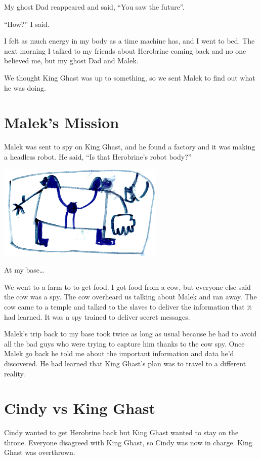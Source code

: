 \documentclass[oneside]{book}
\begin{document}
My ghost Dad reappeared and said, ``You saw the future''.

``How?'' I said.

I felt as much energy in my body as a time machine has, and I went to
bed. The next morning I talked to my friends about Herobrine coming back
and no one believed me, but my ghost Dad and Malek.

We thought King Ghast was up to something, so we sent Malek to find out
what he was doing.

\chapter{Malek's Mission}\label{maleks-mission}

Malek was sent to spy on King Ghast, and he found a factory and it was
making a headless robot. He said, ``Is that Herobrine's robot body?''

\includegraphics[width=3.12500in]{img/10-herobrine.jpg}

At my base\ldots{}

We went to a farm to to get food. I got food from a cow, but everyone
else said the cow was a spy. The cow overheard us talking about Malek
and ran away. The cow came to a temple and talked to the slaves to
deliver the information that it had learned. It was a spy trained to
deliver secret messages.

Malek's trip back to my base took twice as long as usual because he had
to avoid all the bad guys who were trying to capture him thanks to the
cow spy. Once Malek go back he told me about the important information
and data he'd discovered. He had learned that King Ghast's plan was to
travel to a different reality.

\chapter{Cindy vs King Ghast}\label{cindy-vs-king-ghast}

Cindy wanted to get Herobrine back but King Ghast wanted to stay on the
throne. Everyone disagreed with King Ghast, so Cindy was now in charge.
King Ghast was overthrown.
\end{document}
